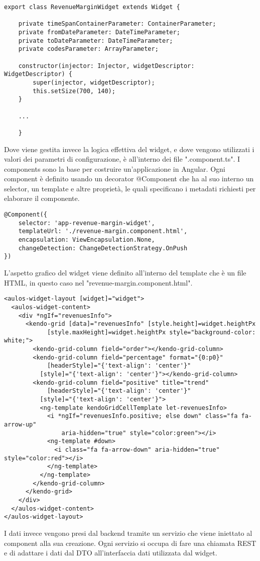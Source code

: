\begin{lstlisting}[caption={File revenue-margin-widget.ts}, style=javaScriptCode]
export class RevenueMarginWidget extends Widget {

    private timeSpanContainerParameter: ContainerParameter;
    private fromDateParameter: DateTimeParameter;
    private toDateParameter: DateTimeParameter;
    private codesParameter: ArrayParameter;

    constructor(injector: Injector, widgetDescriptor: WidgetDescriptor) {
        super(injector, widgetDescriptor);
        this.setSize(700, 140);
    }
    
    ...
    
    }
\end{lstlisting} 
Dove viene gestita invece la logica effettiva del widget, e dove vengono utilizzati i valori dei parametri di configurazione, è all'interno dei file ".component.ts". I components sono la base per costruire un'applicazione in Angular. Ogni component è definito usando un decorator @Component che ha al suo interno un selector, un template e altre proprietà, le quali specificano i metadati richiesti per elaborare il componente.
\begin{lstlisting}[caption={Decorator all'interno del file revenue-margin.component.ts}, style=javaScriptCode]
@Component({
    selector: 'app-revenue-margin-widget',
    templateUrl: './revenue-margin.component.html',
    encapsulation: ViewEncapsulation.None,
    changeDetection: ChangeDetectionStrategy.OnPush
})
\end{lstlisting}
L'aspetto grafico del widget viene definito all'interno del template che è un file HTML, in questo caso nel "revenue-margin.component.html".
\begin{lstlisting}[caption={File revenue-margin.component.html}, style=javaScriptCode]
<aulos-widget-layout [widget]="widget">
  <aulos-widget-content>
    <div *ngIf="revenuesInfo">
      <kendo-grid [data]="revenuesInfo" [style.height]=widget.heightPx 
            [style.maxHeight]=widget.heightPx style="background-color: white;">
        <kendo-grid-column field="order"></kendo-grid-column>
        <kendo-grid-column field="percentage" format="{0:p0}" 
            [headerStyle]="{'text-align': 'center'}"
          [style]="{'text-align': 'center'}"></kendo-grid-column>
        <kendo-grid-column field="positive" title="trend" 
            [headerStyle]="{'text-align': 'center'}"
          [style]="{'text-align': 'center'}">
          <ng-template kendoGridCellTemplate let-revenuesInfo>
            <i *ngIf="revenuesInfo.positive; else down" class="fa fa-arrow-up" 
                aria-hidden="true" style="color:green"></i>
            <ng-template #down>
              <i class="fa fa-arrow-down" aria-hidden="true" style="color:red"></i>
            </ng-template>
          </ng-template>
        </kendo-grid-column>
      </kendo-grid>
    </div>
  </aulos-widget-content>
</aulos-widget-layout>
\end{lstlisting}
I dati invece vengono presi dal backend tramite un servizio che viene iniettato al component alla sua creazione. Ogni servizio si occupa di fare una chiamata REST e di adattare i dati dal DTO all'interfaccia dati utilizzata dal widget.

